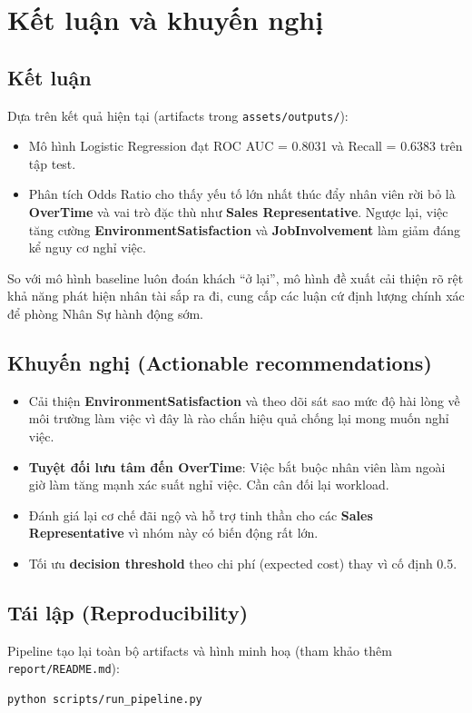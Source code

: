 \chapter{Kết luận và khuyến nghị}

\section{Kết luận}
Dựa trên kết quả hiện tại (artifacts trong \texttt{assets/outputs/}):
\begin{itemize}
  \item Mô hình Logistic Regression đạt ROC AUC = 0.8031 và Recall = 0.6383 trên tập test.
  \item Phân tích Odds Ratio cho thấy yếu tố lớn nhất thúc đẩy nhân viên rời bỏ là \textbf{OverTime} và vai trò đặc thù như \textbf{Sales Representative}. Ngược lại, việc tăng cường \textbf{EnvironmentSatisfaction} và \textbf{JobInvolvement} làm giảm đáng kể nguy cơ nghỉ việc.
\end{itemize}
So với mô hình baseline luôn đoán khách ``ở lại'', mô hình đề xuất cải thiện rõ rệt khả năng phát hiện nhân tài sắp ra đi, cung cấp các luận cứ định lượng chính xác để phòng Nhân Sự hành động sớm.

\section{Khuyến nghị (Actionable recommendations)}
\begin{itemize}
  \item Cải thiện \textbf{EnvironmentSatisfaction} và theo dõi sát sao mức độ hài lòng về môi trường làm việc vì đây là rào chắn hiệu quả chống lại mong muốn nghỉ việc.
  \item \textbf{Tuyệt đối lưu tâm đến OverTime}: Việc bắt buộc nhân viên làm ngoài giờ làm tăng mạnh xác suất nghỉ việc. Cần cân đối lại workload.
  \item Đánh giá lại cơ chế đãi ngộ và hỗ trợ tinh thần cho các \textbf{Sales Representative} vì nhóm này có biến động rất lớn.
  \item Tối ưu \textbf{decision threshold} theo chi phí (expected cost) thay vì cố định 0.5.
\end{itemize}

\section{Tái lập (Reproducibility)}
Pipeline tạo lại toàn bộ artifacts và hình minh hoạ (tham khảo thêm \texttt{report/README.md}):
\begin{verbatim}
python scripts/run_pipeline.py
\end{verbatim}


